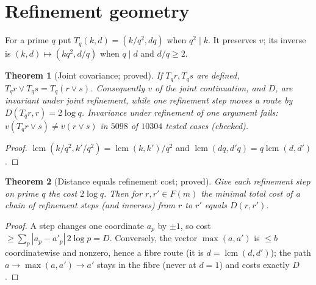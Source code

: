 \documentclass[11pt,a4paper]{article}
\newtheorem{theorem}{Theorem}[section]
\theoremstyle{definition}
\newcommand{\lcm}{\operatorname{lcm}}
\newcommand{\vj}{\mathbin{\vee}}
\begin{document}
\section{Refinement geometry}
For a prime $q$ put $T_q(k,d)=(k/q^2,dq)$ when $q^2\mid k$. It preserves $v$; its inverse is $(k,d)\mapsto(kq^2,d/q)$ when $q\mid d$ and $d/q\ge2$.
\begin{theorem}[Joint covariance; proved]\label{thm:cov}
If $T_q r,T_q s$ are defined, $T_qr\vj T_qs=T_q(r\vj s)$. Consequently $v$ of the joint continuation, and $D$, are invariant under joint refinement, while one refinement step moves a route by $D(T_qr,r)=2\log q$. Invariance under refinement of \emph{one} argument fails: $v(T_qr\vj s)\ne v(r\vj s)$ in $5098$ of $10304$ tested cases (checked).
\end{theorem}
\begin{proof}
$\lcm(k/q^2,k'/q^2)=\lcm(k,k')/q^2$ and $\lcm(dq,d'q)=q\lcm(d,d')$.
\end{proof}
\begin{theorem}[Distance equals refinement cost; proved]\label{thm:geo}
Give each refinement step on prime $q$ the cost $2\log q$. Then for $r,r'\in F(m)$ the minimal total cost of a chain of refinement steps (and inverses) from $r$ to $r'$ equals $D(r,r')$.
\end{theorem}
\begin{proof}
A step changes one coordinate $a_p$ by $\pm1$, so cost $\ge\sum_p|a_p-a'_p|\,2\log p=D$. Conversely, the vector $\max(a,a')$ is $\le b$ coordinatewise and nonzero, hence a fibre route (it is $d=\lcm(d,d')$); the path $a\to\max(a,a')\to a'$ stays in the fibre (never at $d=1$) and costs exactly $D$.
\end{proof}
\end{document}
